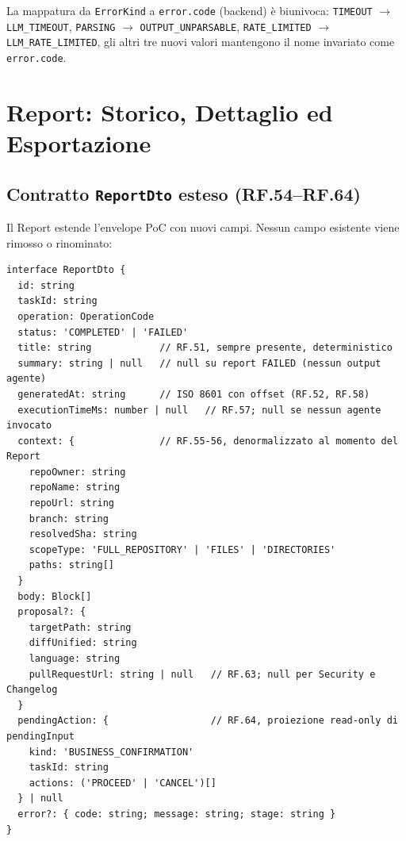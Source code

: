 \documentclass[11pt,a4paper]{article}
\begin{document}
La mappatura da \texttt{ErrorKind} a \texttt{error.code} (backend) è biunivoca: \texttt{TIMEOUT} $\rightarrow$ \texttt{LLM\_TIMEOUT}, \texttt{PARSING} $\rightarrow$ \texttt{OUTPUT\_UNPARSABLE}, \texttt{RATE\_LIMITED} $\rightarrow$ \texttt{LLM\_RATE\_LIMITED}, gli altri tre nuovi valori mantengono il nome invariato come \texttt{error.code}.

\section{Report: Storico, Dettaglio ed Esportazione}
\label{sec:be-report}

\subsection{Contratto \texttt{ReportDto} esteso (RF.54--RF.64)}

Il Report estende l'envelope PoC con nuovi campi. Nessun campo esistente viene rimosso o rinominato:

\begin{lstlisting}[caption={\texttt{ReportDto}: schema completo di \texttt{GET /reports/:id} per l'MVP.}]
interface ReportDto {
  id: string
  taskId: string
  operation: OperationCode
  status: 'COMPLETED' | 'FAILED'
  title: string            // RF.51, sempre presente, deterministico
  summary: string | null   // null su report FAILED (nessun output agente)
  generatedAt: string      // ISO 8601 con offset (RF.52, RF.58)
  executionTimeMs: number | null   // RF.57; null se nessun agente invocato
  context: {               // RF.55-56, denormalizzato al momento del Report
    repoOwner: string
    repoName: string
    repoUrl: string
    branch: string
    resolvedSha: string
    scopeType: 'FULL_REPOSITORY' | 'FILES' | 'DIRECTORIES'
    paths: string[]
  }
  body: Block[]
  proposal?: {
    targetPath: string
    diffUnified: string
    language: string
    pullRequestUrl: string | null   // RF.63; null per Security e Changelog
  }
  pendingAction: {                  // RF.64, proiezione read-only di pendingInput
    kind: 'BUSINESS_CONFIRMATION'
    taskId: string
    actions: ('PROCEED' | 'CANCEL')[]
  } | null
  error?: { code: string; message: string; stage: string }
}
\end{lstlisting}
\end{document}
